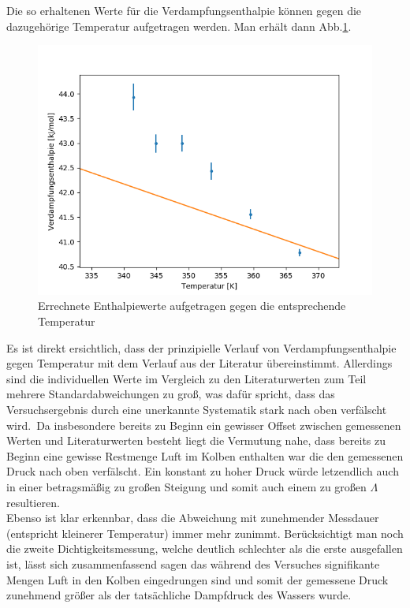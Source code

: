 \documentclass[12pt,a4paper]{article}
\begin{document}
Die so erhaltenen Werte für die Verdampfungsenthalpie können gegen die dazugehörige Temperatur aufgetragen werden. Man erhält dann Abb.\ref{fig:EntTempB}.

\begin{figure}
\begin{center}
\includegraphics[scale=0.8]{Bilder/Enthalpie_gegen_TempB}
\caption[Enthalpie - Temperatur]{Errechnete Enthalpiewerte aufgetragen gegen die entsprechende Temperatur}
\label{fig:EntTempB}
\end{center}
\end{figure}

Es ist direkt ersichtlich, dass der prinzipielle Verlauf von Verdampfungsenthalpie gegen Temperatur mit dem Verlauf aus der Literatur übereinstimmt. Allerdings sind die individuellen Werte im Vergleich zu den Literaturwerten zum Teil mehrere Standardabweichungen zu groß, was dafür spricht, dass das Versuchsergebnis durch eine unerkannte Systematik stark nach oben verfälscht wird.\
Da insbesondere bereits zu Beginn ein gewisser Offset zwischen gemessenen Werten und Literaturwerten besteht liegt die Vermutung nahe, dass bereits zu Beginn eine gewisse Restmenge Luft im Kolben enthalten war die den gemessenen Druck nach oben verfälscht. Ein konstant zu hoher Druck würde letzendlich auch in einer betragsmäßig zu großen Steigung und somit auch einem zu großen $\Lambda$ resultieren.\\
Ebenso ist klar erkennbar, dass die Abweichung mit zunehmender Messdauer (entspricht kleinerer Temperatur) immer mehr zunimmt. Berücksichtigt man noch die zweite Dichtigkeitsmessung, welche deutlich schlechter als die erste ausgefallen ist, lässt sich zusammenfassend sagen das während des Versuches signifikante Mengen Luft in den Kolben eingedrungen sind und somit der gemessene Druck zunehmend größer als der tatsächliche Dampfdruck des Wassers wurde.
\end{document}

